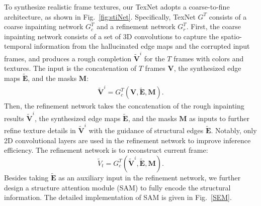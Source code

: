 To synthesize realistic frame textures, our TexNet adopts a coarse-to-fine architecture, as shown in Fig.~\ref{fig:stiNet}.
Specifically, TexNet {\color{blue}$G^T$} consists of a coarse inpainting network {\color{blue}$G_c^T$} and a refinement network {\color{blue}$G_r^T$}.
%
First, the coarse inpainting network consists of a set of 3D convolutions to capture the spatio-temporal information from the hallucinated edge maps and the corrupted input frames, and produces a rough completion $\boldsymbol{\widetilde{V}}^i$ for the $T$ frames with colors and textures. {\color{blue}The input is the concatenation of $T$ frames $\boldsymbol{V}$, the synthesized edge maps $\boldsymbol{\widetilde{E}}$, and the masks $\boldsymbol{M}$}:
{\color{blue}
	\begin{equation}
	\begin{aligned}
	\label{eq:coarsenet}
	\boldsymbol{\widetilde{V}}^i=G_{c}^T(\boldsymbol{V},\boldsymbol{\widetilde{E}},\boldsymbol{M}).
	\end{aligned}
	\end{equation}
}
Then, the refinement network takes {\color{blue}the concatenation of} the rough inpainting results $\boldsymbol{\widetilde{V}}^i$, the synthesized edge maps $\boldsymbol{\widetilde{E}}$, and the masks $\boldsymbol{M}$ as inputs to further refine texture details in $\boldsymbol{\widetilde{V}}^i$ with the guidance of structural edges $\boldsymbol{\widetilde{E}}$. 
Notably, only 2D convolutional layers are used in the refinement network to improve inference efficiency. 
{\color{blue}
	The refinement network is to reconstruct current frame:
	\begin{equation}
	\label{eq:refinenet}
	\widetilde{V}_t=G_{c}^T(\boldsymbol{\widetilde{V}}^i,\boldsymbol{\widetilde{E}},\boldsymbol{M}).	
	\end{equation}
}
Besides taking $\boldsymbol{\widetilde{E}}$ as an auxiliary input in the refinement network, we further design a structure attention module (SAM) to fully encode the structural information.
The detailed implementation of SAM is given in Fig.~\ref{SEM}.
